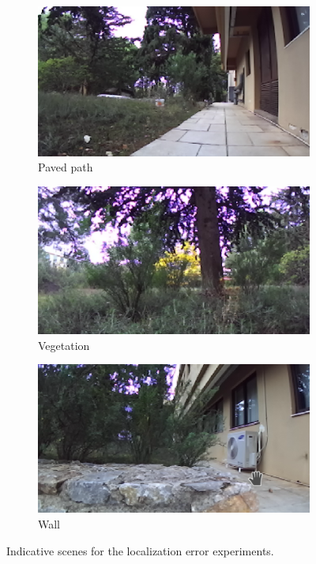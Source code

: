 \documentclass[12pt,a4paper,table,dvipsnames,tikz]{report}
\begin{document}
	\begin{figure}[h!]
		\centering
		\begin{subfigure}[b]{0.3\textwidth}
			\includegraphics[width=\textwidth]{road}
			\caption{Paved path}
		\end{subfigure}
		\begin{subfigure}[b]{0.3\textwidth}
			\includegraphics[width=\textwidth]{grass}
			\caption{Vegetation}
		\end{subfigure}
		\begin{subfigure}[b]{0.3\textwidth}
			\includegraphics[width=\textwidth]{wall}
			\caption{Wall}
		\end{subfigure}
		\caption{Indicative scenes for the localization error experiments.}
		\label{fig:scenes}
	\end{figure}
	
\end{document}
